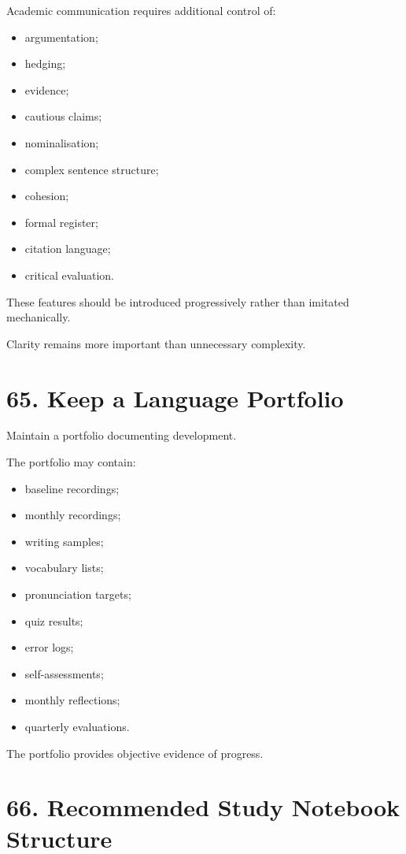 Academic communication requires additional control of:

\begin{itemize}
    \item argumentation;
    \item hedging;
    \item evidence;
    \item cautious claims;
    \item nominalisation;
    \item complex sentence structure;
    \item cohesion;
    \item formal register;
    \item citation language;
    \item critical evaluation.
\end{itemize}

These features should be introduced progressively rather than imitated mechanically.

Clarity remains more important than unnecessary complexity.

\section*{65. Keep a Language Portfolio}

Maintain a portfolio documenting development.

The portfolio may contain:

\begin{itemize}
    \item baseline recordings;
    \item monthly recordings;
    \item writing samples;
    \item vocabulary lists;
    \item pronunciation targets;
    \item quiz results;
    \item error logs;
    \item self-assessments;
    \item monthly reflections;
    \item quarterly evaluations.
\end{itemize}

The portfolio provides objective evidence of progress.

\section*{66. Recommended Study Notebook Structure}

